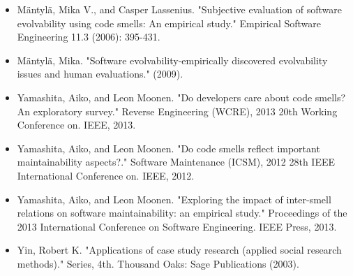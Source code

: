 \documentclass[english,12pt,a4paper,pdftex,sci,utf8]{aaltothesis}
\begin{document}
\begin{itemize}
\item Mäntylä, Mika V., and Casper Lassenius. "Subjective evaluation of software evolvability using code smells: An empirical study." Empirical Software Engineering 11.3 (2006): 395-431.

\item Mäntylä, Mika. "Software evolvability-empirically discovered evolvability issues and human evaluations." (2009).

\item Yamashita, Aiko, and Leon Moonen. "Do developers care about code smells? An exploratory survey." Reverse Engineering (WCRE), 2013 20th Working Conference on. IEEE, 2013.

\item Yamashita, Aiko, and Leon Moonen. "Do code smells reflect important maintainability aspects?." Software Maintenance (ICSM), 2012 28th IEEE International Conference on. IEEE, 2012.

\item Yamashita, Aiko, and Leon Moonen. "Exploring the impact of inter-smell relations on software maintainability: an empirical study." Proceedings of the 2013 International Conference on Software Engineering. IEEE Press, 2013.

\item Yin, Robert K. "Applications of case study research (applied social research methods)." Series, 4th. Thousand Oaks: Sage Publications (2003).
\end{itemize}

\clearpage

\printbibliography[
heading=bibintoc,
title={References}
]




  


\end{document}

